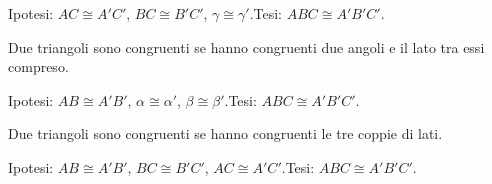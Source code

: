 \begin{inaccessibleblock}
 \begin{figure}[htb]
\centering
\end{figure}
\end{inaccessibleblock}

\noindent Ipotesi: $AC\cong A'C'$, $BC\cong B'C'$, $\gamma \cong 
\gamma'$.\tab Tesi:  $ABC \cong A'B'C'$.

\begin{teorema}
Due triangoli sono congruenti se hanno congruenti due angoli e il 
lato tra essi compreso.
\end{teorema}


\begin{inaccessibleblock}
 \begin{figure}[htb]
\centering
\end{figure}
\end{inaccessibleblock}

\noindent Ipotesi: $AB\cong A'B'$, $\alpha\cong \alpha'$, $\beta 
\cong \beta'$.\tab Tesi:  $ABC \cong A'B'C'$.

\begin{teorema}
	Due triangoli sono congruenti se hanno congruenti le tre coppie di 
	lati.
\end{teorema}


\begin{inaccessibleblock}
	\begin{figure}[htb]
		\centering
	\end{figure}
\end{inaccessibleblock}

\noindent Ipotesi: $AB\cong A'B'$, $BC\cong B'C'$, $AC\cong 
A'C'$.\tab Tesi: $ABC\cong A'B'C'$.


